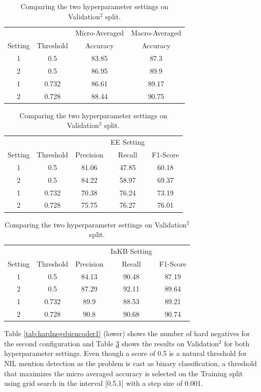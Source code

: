 \documentclass{report}
\theoremstyle{definition}
\theoremstyle{remark}
\begin{document}
\begin{table}[H]
    \centering
    \begin{tabular}{cccc}
    &&Micro-Averaged & Macro-Averaged\\
    Setting & Threshold     & Accuracy &Accuracy \\
    \hline
    1  & 0.5&83.85&87.3\\
    2  & 0.5&86.95&89.9\\
    1  & 0.732&86.61&89.17\\
    2  & 0.728&88.44&90.75\\
    \end{tabular}
    
    \vspace{0.5cm}\begin{tabular}{ccccc}
    &&&EE Setting & \\
    Setting    & Threshold & Precision & Recall & F1-Score \\
    \hline
    1  & 0.5&81.06	&47.85&	60.18\\
    2  & 0.5&84.22&	58.97&	69.37\\
    1  & 0.732&70.38&	76.24&	73.19\\
    2  & 0.728&75.75&	76.27&	76.01\\
    \end{tabular}
    
    \vspace{0.5cm}\begin{tabular}{ccccc}
    &&&InKB Setting & \\
    Setting    & Threshold& Precision & Recall & F1-Score \\
    \hline
    1  & 0.5&84.13&	90.48&	87.19\\
    2  & 0.5&87.29&	92.11&	89.64\\
    1  & 0.732&89.9&	88.53&	89.21\\
    2  &0.728&90.8&	90.68&	90.74\\
    \end{tabular}
    \caption{Comparing the two hyperparameter settings on Validation$^2$ split.}
    \label{tab:biencoderadaptres}
\end{table}

Table \ref{tab:hardnegsbiencoder1} (lower) shows the number of hard negatives for the second configuration and Table \ref{tab:biencoderadaptres} shows the results on Validation$^2$ for both hyperparameter settings. Even though a score of 0.5 is a natural threshold for NIL mention detection as the problem is cast as binary classification, a threshold that maximizes the micro averaged accuracy is selected on the Training split using grid search in the interval [0.5,1] with a step size of 0.001. 
\end{document}
